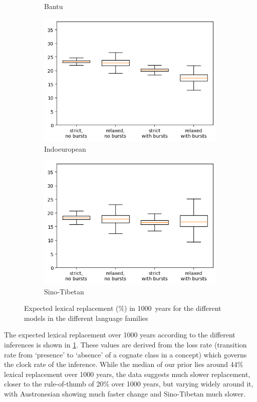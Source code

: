 \documentclass[]{rsos}%
\begin{document}
\begin{figure}
\begin{subfigure}{0.4\textwidth}
    \caption{Bantu}
  \end{subfigure}
  \begin{subfigure}{0.4\textwidth}
    \includegraphics[width=\textwidth]{supplement/analysis/indoeuropean_replacement.png}
    \caption{Indoeuropean}
  \end{subfigure}
  \begin{subfigure}{0.4\textwidth}
    \includegraphics[width=\textwidth]{supplement/analysis/sinotibetan_replacement.png}
    \caption{Sino-Tibetan}
  \end{subfigure}
  \caption{Expected lexical replacement (\%) in 1000~years for the different models
    in the different language families}\label{f:clock}
\end{figure}

The expected lexical replacement over 1000 years according to the different
inferences is shown in \cref{f:clock}. These values are derived from the loss
rate (transition rate from ‘presence’ to ‘absence’ of a cognate class in a
concept) which governs the clock rate of the inference. While the median of our
prior lies around 44\% lexical replacement over 1000 years, the data suggests
much slower replacement, closer to the \textcite{swadesh1955greater}
rule-of-thumb of 20\% over 1000 years, but varying widely around it, with
Austronesian showing much faster change and Sino-Tibetan much slower.
\end{document}
